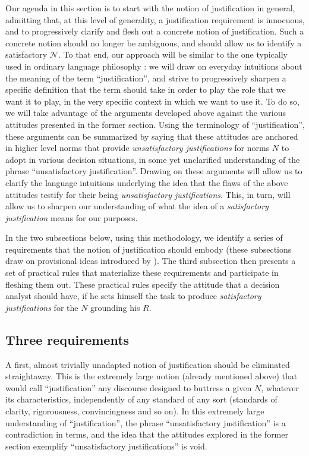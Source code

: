 \documentclass[preprint, french, english, 11pt, authoryear]{elsarticle}%
\newcommand{\adv}{\mathscr{N}}
\begin{document}
Our agenda in this section is to start with the notion of justification in general, admitting that, at this level of generality, a justification requirement is innocuous, and to progressively clarify and flesh out a concrete notion of justification. Such a concrete notion should no longer be ambiguous, and should allow us to identify a satisfactory $\adv$. To that end, our approach will be similar to the one typically used in ordinary language philosophy \citep{soames_philosophical_2003}: we will draw on everyday intuitions about the meaning of the term ``justification'', and strive to progressively sharpen a specific definition that the term should take in order to play the role that we want it to play, in the very specific context in which we want to use it. To do so, we will take advantage of the arguments developed above against the various attitudes presented in the former section. Using the terminology of ``justification'', these arguments can be summarized by saying that these attitudes are anchored in higher level norms that provide \emph{unsatisfactory justifications} for norms $N$ to adopt in various decision situations, in some yet unclarified understanding of the phrase ``unsatisfactory justification''. Drawing on these arguments will allow us to clarify the language intuitions underlying the idea that the flaws of the above attitudes testify for their being \emph{unsatisfactory justifications}. This, in turn, will allow us to sharpen our understanding of what the idea of a \emph{satisfactory justification} means for our purposes.

In the two subsections below, using this methodology, we identify a series of requirements that the notion of justification should embody (these subsections draw on provisional ideas introduced by \citet{meinard_du_2013, meinard_what_2017}). The third subsection then presents a set of practical rules that materialize these requirements and participate in fleshing them out. These practical rules specify the attitude that a decision analyst should have, if he sets himself the task to produce \emph{satisfactory justifications} for the $N$ grounding his $R$.

\subsection{Three requirements}
A first, almost trivially unadapted notion of justification should be eliminated straightaway. This is the extremely large notion (already mentioned above) that would call ``justification'' any discourse designed to buttress a given $N$, whatever its characteristics, independently of any standard of any sort (standards of clarity, rigorousness, convincingness and so on). In this extremely large understanding of ``justification'', the phrase ``unsatisfactory justification'' is a contradiction in terms, and the idea that the attitudes explored in the former section exemplify ``unsatisfactory justifications'' is void.
\end{document}
